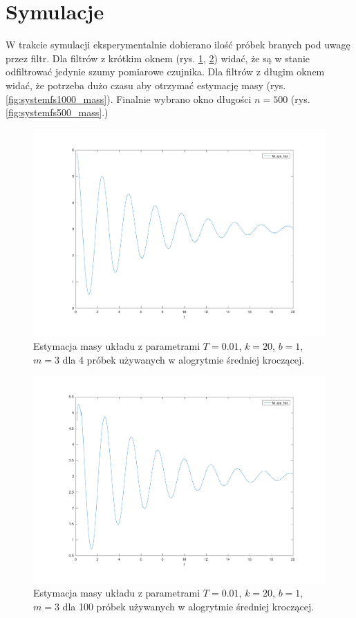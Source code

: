 \documentclass[a4paper, 10pt]{article}
\begin{document}
\section{Symulacje}

W trakcie symulacji eksperymentalnie dobierano ilość próbek branych pod uwagę przez filtr. Dla filtrów z krótkim oknem (rys. \ref{fig:systemfs4_mass}, \ref{fig:systemfs100_mass}) widać, że są w stanie odfiltrować jedynie szumy pomiarowe czujnika. Dla filtrów z długim oknem widać, że potrzeba dużo czasu aby otrzymać estymację masy (rys. \ref{fig:systemfs1000_mass}). Finalnie wybrano okno długości $n = 500$ (rys. \ref{fig:systemfs500_mass}.)

\begin{figure}[H]
	\includegraphics[width=0.99\linewidth]{systemfs4_mass}
	\centering
	\caption{Estymacja masy układu z parametrami $T=0.01$, $k = 20$, $b = 1$, $m = 3$ dla 4 próbek używanych w alogrytmie średniej kroczącej. }
	\label{fig:systemfs4_mass}
\end{figure}

\begin{figure}[H]
	\includegraphics[width=0.99\linewidth]{systemfs100_mass}
	\centering
	\caption{Estymacja masy układu z parametrami $T=0.01$, $k = 20$, $b = 1$, $m = 3$ dla 100 próbek używanych w alogrytmie średniej kroczącej.}
	\label{fig:systemfs100_mass}
\end{figure}
\end{document}
